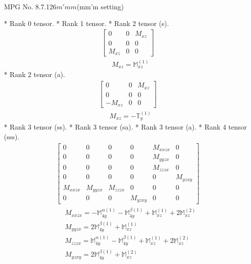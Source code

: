 \documentclass[fleqn,8pt,landscape]{jsarticle}
\begin{document}
\setcounter{MaxMatrixCols}{32}

\renewcommand{\tablename}{Table~}
\renewcommand{\figurename}{Figure~}
\begin{center}
\LARGE
MPG No. 8.7.126\quad$m'mm$\quad(mm'm setting)
\end{center}
* Rank 0 tensor.
* Rank 1 tensor.
* Rank 2 tensor (s).
\begin{align*}
\begin{bmatrix} 0 & 0 & M_{xz} \\ 0 & 0 & 0 \\ M_{xz} & 0 & 0 \end{bmatrix}
\end{align*}
\begin{align*}
& M_{xz} = \mathbb{M}_{xz}^{(1)}
\end{align*}
* Rank 2 tensor (a).
\begin{align*}
\begin{bmatrix} 0 & 0 & M_{xz} \\ 0 & 0 & 0 \\ - M_{xz} & 0 & 0 \end{bmatrix}
\end{align*}
\begin{align*}
& M_{xz} = - \mathbb{T}_{y}^{(1)}
\end{align*}
* Rank 3 tensor (ss).
* Rank 3 tensor (sa).
* Rank 3 tensor (a).
* Rank 4 tensor (sss).
\begin{align*}
\begin{bmatrix} 0 & 0 & 0 & 0 & M_{xxzx} & 0 \\ 0 & 0 & 0 & 0 & M_{yyzx} & 0 \\ 0 & 0 & 0 & 0 & M_{zzzx} & 0 \\ 0 & 0 & 0 & 0 & 0 & M_{yzxy} \\ M_{xxzx} & M_{yyzx} & M_{zzzx} & 0 & 0 & 0 \\ 0 & 0 & 0 & M_{yzxy} & 0 & 0 \end{bmatrix}
\end{align*}
\begin{align*}
& M_{xxzx} = - \mathbb{M}_{4y}^{\alpha(1)} - \mathbb{M}_{4y}^{\beta(1)} + \mathbb{M}_{xz}^{(1)} + 2 \mathbb{M}_{xz}^{(2)} \\
& M_{yyzx} = 2 \mathbb{M}_{4y}^{\beta(1)} + \mathbb{M}_{xz}^{(1)} \\
& M_{zzzx} = \mathbb{M}_{4y}^{\alpha(1)} - \mathbb{M}_{4y}^{\beta(1)} + \mathbb{M}_{xz}^{(1)} + 2 \mathbb{M}_{xz}^{(2)} \\
& M_{yzxy} = 2 \mathbb{M}_{4y}^{\beta(1)} + \mathbb{M}_{xz}^{(2)}
\end{align*}
\end{document}

